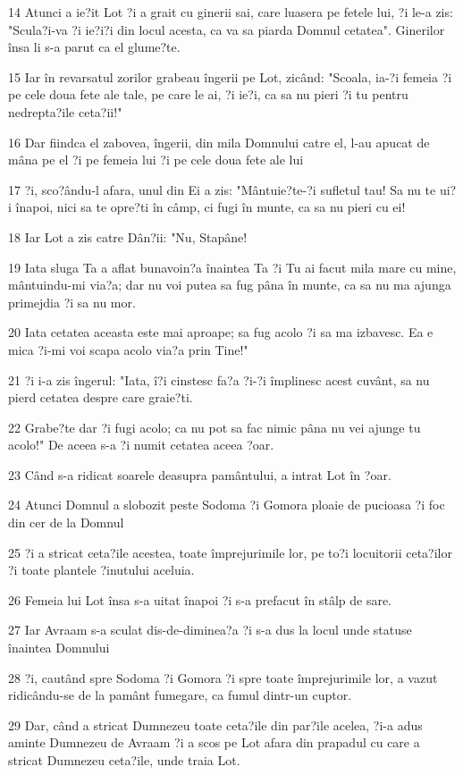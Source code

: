 \par 14 Atunci a ie?it Lot ?i a grait cu ginerii sai, care luasera pe fetele lui, ?i le-a zis: "Scula?i-va ?i ie?i?i din locul acesta, ca va sa piarda Domnul cetatea". Ginerilor însa li s-a parut ca el glume?te.
\par 15 Iar în revarsatul zorilor grabeau îngerii pe Lot, zicând: "Scoala, ia-?i femeia ?i pe cele doua fete ale tale, pe care le ai, ?i ie?i, ca sa nu pieri ?i tu pentru nedrepta?ile ceta?ii!"
\par 16 Dar fiindca el zabovea, îngerii, din mila Domnului catre el, l-au apucat de mâna pe el ?i pe femeia lui ?i pe cele doua fete ale lui
\par 17 ?i, sco?ându-l afara, unul din Ei a zis: "Mântuie?te-?i sufletul tau! Sa nu te ui?i înapoi, nici sa te opre?ti în câmp, ci fugi în munte, ca sa nu pieri cu ei!
\par 18 Iar Lot a zis catre Dân?ii: "Nu, Stapâne!
\par 19 Iata sluga Ta a aflat bunavoin?a înaintea Ta ?i Tu ai facut mila mare cu mine, mântuindu-mi via?a; dar nu voi putea sa fug pâna în munte, ca sa nu ma ajunga primejdia ?i sa nu mor.
\par 20 Iata cetatea aceasta este mai aproape; sa fug acolo ?i sa ma izbavesc. Ea e mica ?i-mi voi scapa acolo via?a prin Tine!"
\par 21 ?i i-a zis îngerul: "Iata, î?i cinstesc fa?a ?i-?i împlinesc acest cuvânt, sa nu pierd cetatea despre care graie?ti.
\par 22 Grabe?te dar ?i fugi acolo; ca nu pot sa fac nimic pâna nu vei ajunge tu acolo!" De aceea s-a ?i numit cetatea aceea ?oar.
\par 23 Când s-a ridicat soarele deasupra pamântului, a intrat Lot în ?oar.
\par 24 Atunci Domnul a slobozit peste Sodoma ?i Gomora ploaie de pucioasa ?i foc din cer de la Domnul
\par 25 ?i a stricat ceta?ile acestea, toate împrejurimile lor, pe to?i locuitorii ceta?ilor ?i toate plantele ?inutului aceluia.
\par 26 Femeia lui Lot însa s-a uitat înapoi ?i s-a prefacut în stâlp de sare.
\par 27 Iar Avraam s-a sculat dis-de-diminea?a ?i s-a dus la locul unde statuse înaintea Domnului
\par 28 ?i, cautând spre Sodoma ?i Gomora ?i spre toate împrejurimile lor, a vazut ridicându-se de la pamânt fumegare, ca fumul dintr-un cuptor.
\par 29 Dar, când a stricat Dumnezeu toate ceta?ile din par?ile acelea, ?i-a adus aminte Dumnezeu de Avraam ?i a scos pe Lot afara din prapadul cu care a stricat Dumnezeu ceta?ile, unde traia Lot.
